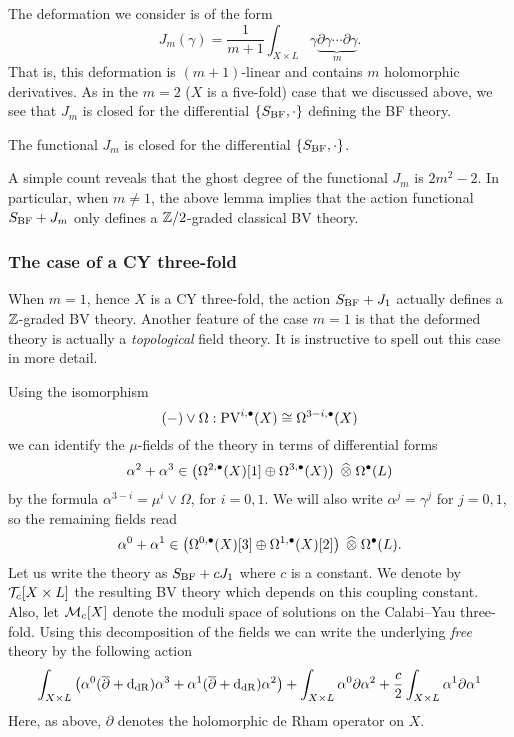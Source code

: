 \documentclass[11pt]{amsart}
\def\PV{{\rm PV}}
\begin{document}
The deformation we consider is of the form
\[
  J_m (\gamma) = \frac{1}{m+1} \int_{X \times L} \gamma \underbrace{\partial \gamma \cdots \partial \gamma}_{m} .
\]
That is, this deformation is $(m+1)$-linear and contains $m$ holomorphic derivatives.
As in the $m=2$ ($X$ is a five-fold) case that we discussed above, we see that $J_m$ is closed for the differential $\{S_{\rm BF},\cdot\}$ defining the BF theory.

\begin{lem}
  The functional $J_m$ is closed for the differential $\{S_{\rm BF}, \cdot \}$.
\end{lem}

A simple count reveals that the ghost degree of the functional $J_m$ is $2m^2 - 2$.
In particular, when $m \ne 1$, the above lemma implies that the action functional $S_{\rm BF} + J_m$ only defines a $\mathbb Z/2$-graded classical BV theory.

\subsubsection{The case of a CY three-fold}

When $m=1$, hence $X$ is a CY three-fold, the action $S_{\rm BF} + J_1$ actually defines a $\mathbb Z$-graded BV theory.
Another feature of the case $m=1$ is that the deformed theory is actually a {\em topological} field theory.
It is instructive to spell out this case in more detail.

Using the isomorphism
\[
 (-) \vee \Omega : \PV^{i,\bu} (X) \cong \Omega^{3-i, \bu}(X)
\]
we can identify the $\mu$-fields of the theory in terms of differential forms
\[
  \alpha^2 + \alpha^3 \in \left(\Omega^{2,\bullet}(X)[1] \oplus \Omega^{3,\bullet}(X)\right) \; \widehat{\otimes} \; \Omega^\bullet(L)
\]
by the formula $\alpha^{3-i} = \mu^{i} \vee \Omega$, for $i=0,1$.
We will also write $\alpha^{j} = \gamma^{j}$ for $j=0,1$, so the remaining fields read
\[
  \alpha^0 + \alpha^1 \in \left(\Omega^{0,\bullet}(X)[3] \oplus \Omega^{1,\bullet}(X)[2] \right) \; \widehat{\otimes} \; \Omega^\bullet (L).
\]
Let us write the theory as $S_{\rm BF} + c J_1$ where $c$ is a constant.
We denote by $\mathcal T_c [X \times L]$ the resulting BV theory which depends on this coupling constant.
Also, let $\mathcal M_c[X]$ denote the moduli space of solutions on the Calabi--Yau three-fold.
Using this decomposition of the fields we can write the underlying {\em free} theory by the following action
\[
  \int_{X\times L} \left(\alpha^0 (\overline{\partial} + {\rm d}_{\rm dR}) \alpha^3 + \alpha^1 (\overline{\partial} + {\rm d}_{\rm dR}) \alpha^2 \right) + \int_{X \times L} \alpha^0 \partial \alpha^2 + \frac{c}{2} \int_{X \times L} \alpha^1 \partial \alpha^1
\]
Here, as above, $\partial$ denotes the holomorphic de Rham operator on $X$.
\end{document}
